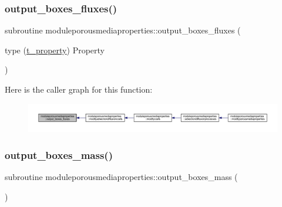 \subsubsection{\texorpdfstring{output\+\_\+boxes\+\_\+fluxes()}{output\_boxes\_fluxes()}}
{\footnotesize\ttfamily subroutine moduleporousmediaproperties\+::output\+\_\+boxes\+\_\+fluxes (\begin{DoxyParamCaption}\item[{type (\mbox{\hyperlink{structmoduleporousmediaproperties_1_1t__property}{t\+\_\+property}})}]{Property }\end{DoxyParamCaption})\hspace{0.3cm}{\ttfamily [private]}}

Here is the caller graph for this function\+:\nopagebreak
\begin{figure}[H]
\begin{center}
\leavevmode
\includegraphics[width=350pt]{namespacemoduleporousmediaproperties_a7485615a66ceb16b22cd17c505c048ff_icgraph}
\end{center}
\end{figure}
\mbox{\label{namespacemoduleporousmediaproperties_a4763c798964b2cbb6e1e012ba2141ff8}} 
\subsubsection{\texorpdfstring{output\+\_\+boxes\+\_\+mass()}{output\_boxes\_mass()}}
{\footnotesize\ttfamily subroutine moduleporousmediaproperties\+::output\+\_\+boxes\+\_\+mass (\begin{DoxyParamCaption}{ }\end{DoxyParamCaption})\hspace{0.3cm}{\ttfamily [private]}}

